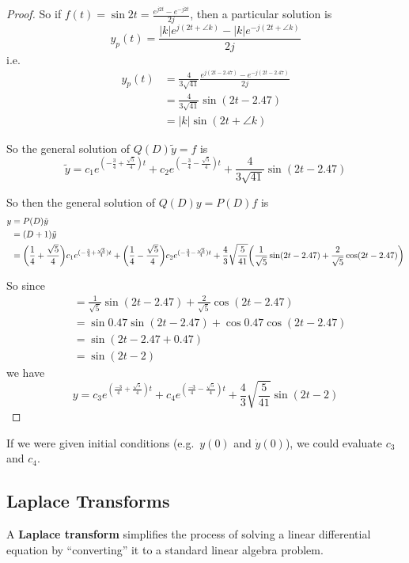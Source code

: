 \documentclass[12pt]{article}
\begin{document}
\begin{example}
\begin{proof}
So if $f(t) = \sin 2t = \frac{e^{j2t} - e^{-j2t}}{2j}$, then a particular solution is \[ y_p(t) = \frac{|k|e^{j(2t+\angle k)} - |k|e^{-j(2t+\angle k)}}{2j} \] i.e.\
\begin{align*}
y_p(t) &= \frac{4}{3\sqrt{41}} \frac{e^{j(2t-2.47)} - e^{-j(2t-2.47)}}{2j}\\
&= \frac{4}{3\sqrt{41}} \sin(2t-2.47)\\
&= |k|\sin (2t + \angle k)
\end{align*}

So the general solution of $Q(D) \tilde y = f$ is \[ \tilde y = c_1 e^{(-\frac{3}{4} + \frac{\sqrt{5}}{4})t} + c_2 e^{(-\frac{3}{4} - \frac{\sqrt{5}}{4})t} + \frac{4}{3\sqrt{41}} \sin(2t-2.47) \]

So then the general solution of $Q(D)y = P(D)f$ is
\begin{align*}
y &= P(D)\tilde y\\
&= (D+1)\tilde y\\
&= \bigg(\frac{1}{4} + \frac{\sqrt{5}}{4}\bigg) c_1 e^{(-\frac{3}{4} + \frac{\sqrt{5}}{4})t} + \bigg(\frac{1}{4} - \frac{\sqrt{5}}{4}\bigg) c_2 e^{(-\frac{3}{4} - \frac{\sqrt{5}}{4})t} + \frac{4}{3}\sqrt{\frac{5}{41}} \bigg(\frac{1}{\sqrt{5}} \sin(2t - 2.47) + \frac{2}{\sqrt{5}} \cos(2t-2.47) \bigg)
\end{align*}

So since
\begin{align*}
&= \frac{1}{\sqrt{5}} \sin(2t-2.47) + \frac{2}{\sqrt{5}} \cos(2t-2.47)\\
&= \sin 0.47\sin(2t-2.47) + \cos 0.47\cos(2t-2.47)\\
&= \sin(2t-2.47+0.47)\\
&= \sin(2t-2)
\end{align*}
we have \[ y = c_3 e^{(\frac{-3}{4} + \frac{\sqrt{5}}{4})t} + c_4 e^{(\frac{-3}{4} - \frac{\sqrt{5}}{4})t} + \frac{4}{3} \sqrt{\frac{5}{41}} \sin(2t-2) \]
\end{proof}

If we were given initial conditions (e.g.\ $y(0)$ and $\dot y(0)$), we could evaluate $c_3$ and $c_4$.
\end{example}

\subsection{Laplace Transforms}
A {\bf Laplace transform} simplifies the process of solving a linear differential equation by ``converting'' it to a standard linear algebra problem.
\end{document}

